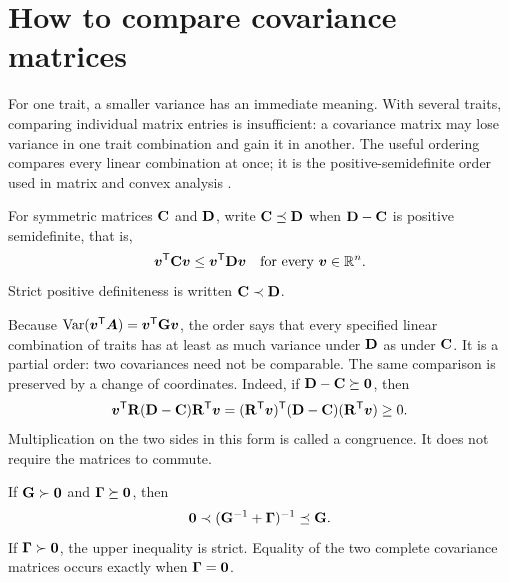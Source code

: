 \section{How to compare covariance matrices}
\label{inheritance:matrix-order}

For one trait, a smaller variance has an immediate meaning. With several
traits, comparing individual matrix entries is insufficient: a covariance
matrix may lose variance in one trait combination and gain it in another.
The useful ordering compares every linear combination at once; it is the
positive-semidefinite order used in matrix and convex analysis
\citep{BoydVandenberghe2004}.

\begin{definition}
  \label{inheritance:loewner}
  For symmetric matrices $\mathbf{C}$ and $\mathbf{D}$, write
  $\mathbf{C}\preceq\mathbf{D}$ when $\mathbf{D}-\mathbf{C}$ is positive semidefinite,
  that is,
  \begin{equation}
    \boldsymbol{v}^{\mathsf T}\mathbf{C}\boldsymbol{v}
       \leq\boldsymbol{v}^{\mathsf T}\mathbf{D}\boldsymbol{v}
       \quad\text{for every }\boldsymbol{v}\in\mathbb R^n.
  \end{equation}
  Strict positive definiteness is written $\mathbf{C}\prec\mathbf{D}$.
\end{definition}

Because $\operatorname{Var}(\boldsymbol{v}^{\mathsf T}\boldsymbol{A})=
\boldsymbol{v}^{\mathsf T}\mathbf{G}\boldsymbol{v}$, the order says that every specified
linear combination of traits has at least as much variance under
$\mathbf{D}$ as under $\mathbf{C}$. It is a partial order: two covariances need
not be comparable. The same comparison is preserved by a change of
coordinates. Indeed, if $\mathbf{D}-\mathbf{C}\succeq\mathbf{0}$, then
\begin{equation}
  \boldsymbol{v}^{\mathsf T}\mathbf{R}(\mathbf{D}-\mathbf{C})\mathbf{R}^{\mathsf T}\boldsymbol{v}
   =(\mathbf{R}^{\mathsf T}\boldsymbol{v})^{\mathsf T}
       (\mathbf{D}-\mathbf{C})(\mathbf{R}^{\mathsf T}\boldsymbol{v})\geq0.
  \label{inheritance:congruence-order}
\end{equation}
Multiplication on the two sides in this form is called a congruence.
It does not require the matrices to commute.

\begin{lemma}
  \label{inheritance:inverse-order}
  If $\mathbf{G}\succ\mathbf{0}$ and $\boldsymbol{\Gamma}\succeq\mathbf{0}$, then
  \begin{equation}
    \mathbf{0}\prec (\mathbf{G}^{-1}+\boldsymbol{\Gamma})^{-1}\preceq\mathbf{G}.
    \label{inheritance:selection-order}
  \end{equation}
  If $\boldsymbol{\Gamma}\succ\mathbf{0}$, the upper inequality is strict.
  Equality of the two complete covariance matrices occurs exactly when
  $\boldsymbol{\Gamma}=\mathbf{0}$.
\end{lemma}

